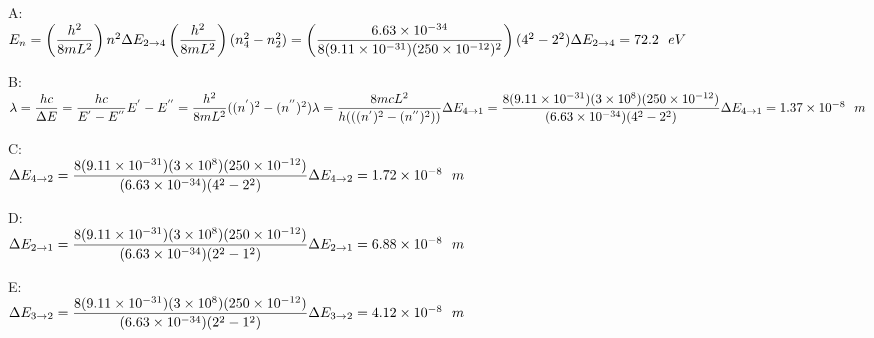 \documentclass[fleqn]{article}
\begin{document}
\begin{enumerate}
      \textcolor{hwColor}{
        A: \\
        $
          E_n=\left(\dfrac{h^2}{8mL^2}\right)n^2 \\
          \\
          \Delta E_{2 \rightarrow 4}\left(\dfrac{h^2}{8mL^2}\right)(n^2_4-n^2_2)=\left(\dfrac{6.63 \times 10^{-34}}{8(9.11 \times 10^{-31})(250 \times 10^{-12})^2}\right)(4^2-2^2) \\
          \\
          \Delta E_{2 \rightarrow 4}=72.2 ~~ eV
        $
      }

      \textcolor{hwColor}{
        B: \\
        $
          \lambda=\dfrac{hc}{\Delta E}=\dfrac{hc}{E^{'}-E^{''}} \\
          \\
          E^{'}-E^{''}=\dfrac{h^2}{8mL^2}((n^{'})^2-(n^{''})^2) \\
          \\
          \lambda=\dfrac{8mcL^2}{h(((n^{'})^2-(n^{''})^2))} \\
          \\
          \Delta E_{4 \rightarrow 1}=\dfrac{8(9.11 \times 10^{-31})(3 \times 10^8)(250 \times 10^{-12})}{(6.63 \times 10^{-34})(4^2-2^2)} \\
          \\
          \Delta E_{4 \rightarrow 1}=1.37 \times 10^{-8} ~~ m
        $
      }

      \textcolor{hwColor}{
        C: \\
        $
          \Delta E_{4 \rightarrow 2}=\dfrac{8(9.11 \times 10^{-31})(3 \times 10^8)(250 \times 10^{-12})}{(6.63 \times 10^{-34})(4^2-2^2)} \\
          \\
          \Delta E_{4 \rightarrow 2}=1.72 \times 10^{-8} ~~ m
        $
      }

      \textcolor{hwColor}{
        D: \\
        $
          \Delta E_{2 \rightarrow 1}=\dfrac{8(9.11 \times 10^{-31})(3 \times 10^8)(250 \times 10^{-12})}{(6.63 \times 10^{-34})(2^2-1^2)} \\
          \\
          \Delta E_{2 \rightarrow 1}=6.88 \times 10^{-8} ~~ m
        $
      }


      \textcolor{hwColor}{
        E: \\
        $
          \Delta E_{3 \rightarrow 2}=\dfrac{8(9.11 \times 10^{-31})(3 \times 10^8)(250 \times 10^{-12})}{(6.63 \times 10^{-34})(2^2-1^2)} \\
          \\
          \Delta E_{3 \rightarrow 2}=4.12 \times 10^{-8} ~~ m
        $
      }


\end{enumerate}
\end{document}
